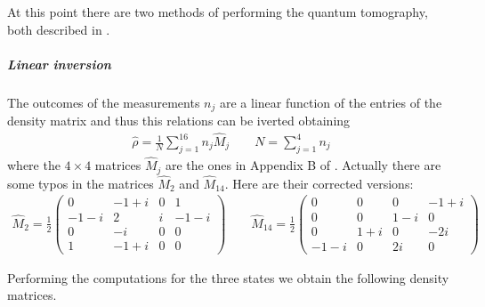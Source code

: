 \documentclass[a4paper, 11pt]{article}
\begin{document}
    At this point there are two methods of performing the quantum tomography, both described in \cite{rif:tomo}.

    \subparagraph{Linear inversion}
      The outcomes of the measurements $n_j$ are a linear function of the entries of the density matrix and thus this relations can be iverted obtaining
      \begin{gather*}
        \hat{\rho} = \frac{1}{N}\sum_{j = 1}^{16} n_j \hat{M}_j
        \qquad N = \sum_{j = 1}^4 n_j
      \end{gather*}
      where the $4 \times 4$ matrices $\hat{M}_j$ are the ones in Appendix B of \cite{rif:tomo}. Actually there are some typos in the matrices $\hat{M}_2$ and $\hat{M}_{14}$. Here are their corrected versions:
      \begin{gather*}
        \hat{M}_2 = \frac{1}{2}
        \begin{pmatrix}
          0 & -1 + i & 0 & 1 \\
          -1 - i & 2 & i & -1 -i \\
          0 & -i & 0 & 0 \\
          1 & -1 + i & 0 & 0
        \end{pmatrix}
        \qquad
        \hat{M}_{14} = \frac{1}{2}
        \begin{pmatrix}
          0 & 0 & 0 & -1 + i \\
          0 & 0 & 1 - i & 0 \\
          0 & 1 + i & 0 & -2i \\
          -1 -i & 0 & 2i & 0
        \end{pmatrix}
      \end{gather*}

      Performing the computations for the three states we obtain the following density matrices.
\end{document}
